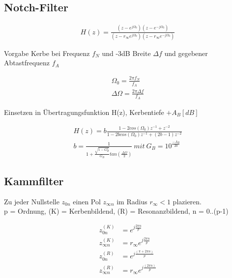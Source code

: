 \documentclass[10pt,a4paper]{article}
\begin{document}
\subsection{Notch-Filter}
  \begin{mdframed}[style=exercise]
    \begin{align}
        H(z)=\frac{(z-e^{j\Omega_0})(z-e^{-j\Omega_0})}{(z-r_{\infty}e^{j\Omega_0})(z-r_{\infty}e^{-j\Omega_0})}
    \end{align}
  \end{mdframed}
Vorgabe Kerbe bei Frequenz $f_N$ und -3dB Breite $\Delta f$ und gegebener Abtastfrequenz $f_A$
  \begin{mdframed}[style=exercise]
    \begin{align}
        \Omega_0=\frac{2\pi f_N}{f_A}\\
        \Delta\Omega=\frac{2\pi\Delta f}{f_A}
    \end{align}
  \end{mdframed}
Einsetzen in Übertragungsfunktion H(z), Kerbentiefe $+A_B[dB]$
  \begin{mdframed}[style=exercise]
    \begin{align}
        H(z)=b\frac{1-2cos(\Omega_0)z^{-1}+z^{-2}}{1-2bcos(\Omega_0)z^{-1}+(2b-1)z^{-2}}\\
        b=\frac{1}{1+\frac{\sqrt{1-G_B^2}}{G_B}tan(\frac{\Delta\Omega}{2})} \ mit \ G_B=10^{\frac{-A_B}{20}}
    \end{align}
  \end{mdframed}
\subsection{Kammfilter}
Zu jeder Nullstelle $z_{0n}$ einen Pol $z_{\infty n}$ im Radius $r_\infty<1$ plazieren.\\ 
p = Ordnung, (K) = Kerbenbildend, (R) = Resonanzbildend, n = 0..(p-1)
  \begin{mdframed}[style=exercise]
    \begin{align}
        z_{0n}^{(K)} &= e^{j\frac{2\pi n}{p}} \\
        z_{\infty n}^{(K)} &= r_\infty e^{j\frac{2\pi n}{p}}\\
        z_{0n}^{(R)} &= e^{j\frac{(\pi + 2\pi n)}{p}}\\
        z_{\infty n}^{(R)} &= r_\infty e^{j\frac{(2\pi n)}{p}}
    \end{align}
  \end{mdframed}
\end{document}
